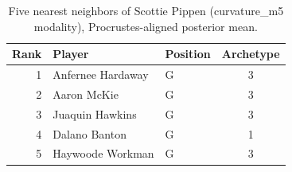 \begin{table}[htbp]
  \centering\small
  \begin{tabular}{rllc}
    \toprule
    Rank & Player & Position & Archetype \\
    \midrule
    1 & Anfernee Hardaway & G & 3 \\
    2 & Aaron McKie & G & 3 \\
    3 & Juaquin Hawkins & G & 3 \\
    4 & Dalano Banton & G & 1 \\
    5 & Haywoode Workman & G & 3 \\
    \bottomrule
  \end{tabular}
  \caption{Five nearest neighbors of Scottie Pippen (curvature_m5 modality), Procrustes-aligned posterior mean.}
  \label{tab:Scottie_Pippen_neighbors_curvature_m5}
\end{table}

